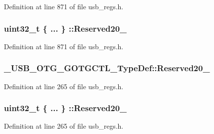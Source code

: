 Definition at line 871 of file usb\-\_\-regs.\-h.

\hypertarget{group___u_s_b___o_t_g___d_r_i_v_e_r_ga6b72d14b81bddb754a1e1dd45558b631}{
\subsubsection[{Reserved20\-\_\-28}]{\setlength{\rightskip}{0pt plus 5cm}uint32\-\_\-t \{ ... \} \-::Reserved20\-\_}}\label{group___u_s_b___o_t_g___d_r_i_v_e_r_ga6b72d14b81bddb754a1e1dd45558b631}


Definition at line 871 of file usb\-\_\-regs.\-h.

\hypertarget{group___u_s_b___o_t_g___d_r_i_v_e_r_ga2f71a4f5cc3e92d646e2488ba26e4e5c}{
\subsubsection[{Reserved20\-\_\-31}]{ \-\_\-\-U\-S\-B\-\_\-\-O\-T\-G\-\_\-\-G\-O\-T\-G\-C\-T\-L\-\_\-\-Type\-Def\-::\-Reserved20\-\_}}\label{group___u_s_b___o_t_g___d_r_i_v_e_r_ga2f71a4f5cc3e92d646e2488ba26e4e5c}


Definition at line 265 of file usb\-\_\-regs.\-h.

\hypertarget{group___u_s_b___o_t_g___d_r_i_v_e_r_ga2eeb841cd126ff4b765bae4cb9a09092}{
\subsubsection[{Reserved20\-\_\-31}]{\setlength{\rightskip}{0pt plus 5cm}uint32\-\_\-t \{ ... \} \-::Reserved20\-\_}}\label{group___u_s_b___o_t_g___d_r_i_v_e_r_ga2eeb841cd126ff4b765bae4cb9a09092}


Definition at line 265 of file usb\-\_\-regs.\-h.

